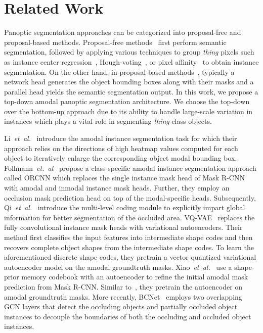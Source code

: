 \documentclass[10pt,twocolumn,letterpaper]{article}
\begin{document}
%
 
\section{Related Work}
Panoptic segmentation approaches can be categorized into proposal-free and proposal-based methods. Proposal-free methods~\cite{Gao_2019_ICCV, cheng2020panoptic, wang2020axial} first perform semantic segmentation, followed by applying various techniques to group \textit{thing} pixels such as instance center regression~\cite{uhrig2018box2pix}, Hough-voting~\cite{leibe2004combined}, or pixel affinity~\cite{keuper2015efficient} to obtain instance segmentation. On the other hand, in proposal-based methods~\cite{gosala2022bird, mohan2020efficientps, sirohi2021efficientlps}, typically a network head generates the object bounding boxes along with their masks and a parallel head yields the semantic segmentation output. In this work, we propose a top-down amodal panoptic segmentation architecture. We choose the top-down over the bottom-up approach due to its ability to handle large-scale variation in instances which plays a vital role in segmenting \textit{thing} class objects.

Li~\textit{et~al.}~\cite{li2016amodal} introduce the amodal instance segmentation task for which their approach relies on the directions of high heatmap values computed for each object to iteratively enlarge the corresponding object modal bounding box. Follmann~\textit{et.~al}~\cite{follmann2019learning} propose a class-specific amodal instance segmentation approach called ORCNN which replaces the single instance mask head of Mask R-CNN~\cite{he2017mask} with amodal and inmodal instance mask heads. Further, they employ an occlusion mask prediction head on top of the modal-specific heads. Subsequently, Qi~\textit{et~al.}~\cite{qi2019amodal} introduce the multi-level coding module to explicitly impart global information for better segmentation of the occluded area. VQ-VAE~\cite{jang2020learning} replaces the fully convolutional instance mask heads with variational autoencoders. Their method first classifies the input features into intermediate shape codes and then recovers complete object shapes from the intermediate shape codes. To learn the aforementioned discrete shape codes, they pretrain a vector quantized variational autoencoder model on the amodal groundtruth masks. Xiao~\textit{et~al.}~\cite{yuting2021amodal} use a shape-prior memory codebook with an autoencoder to refine the initial amodal mask prediction from Mask R-CNN. Similar to~\cite{jang2020learning}, they pretrain the autoencoder on amodal groundtruth masks. More recently, BCNet~\cite{Ke_2021_CVPR} employs two overlapping GCN layers that detect the occluding objects and partially occluded object instances to decouple the boundaries of both the occluding and occluded object instances.
\end{document}
